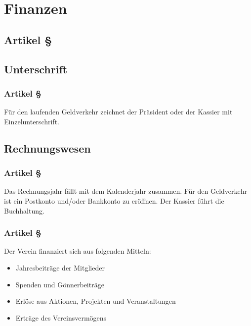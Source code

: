 \section{Finanzen}

\subsection*{Artikel §\articlenumber}


\subsection{Unterschrift}

\subsubsection*{Artikel §\articlenumber}
Für den laufenden Geldverkehr zeichnet der Präsident oder 
der Kassier mit Einzelunterschrift.

\subsection{Rechnungswesen}

\subsubsection*{Artikel §\articlenumber}
Das Rechnungsjahr fällt mit dem Kalenderjahr zusammen. Für
den Geldverkehr ist ein Postkonto und/oder Bankkonto zu
eröffnen. Der Kassier führt die Buchhaltung.

\subsubsection*{Artikel §\articlenumber}
Der Verein finanziert sich aus folgenden Mitteln:
\begin{itemize}
\item Jahresbeiträge der Mitglieder
\item Spenden und Gönnerbeiträge
\item Erlöse aus Aktionen, Projekten und Veranstaltungen
\item Erträge des Vereinsvermögens
\end{itemize}
 
